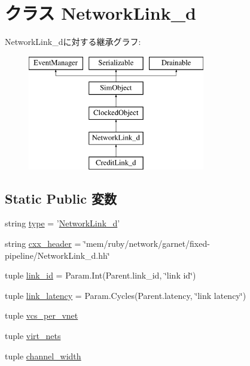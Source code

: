 \hypertarget{classGarnetLink__d_1_1NetworkLink__d}{
\section{クラス NetworkLink\_\-d}
\label{classGarnetLink__d_1_1NetworkLink__d}
}
NetworkLink\_\-dに対する継承グラフ:\begin{figure}[H]
\begin{center}
\leavevmode
\includegraphics[height=5cm]{classGarnetLink__d_1_1NetworkLink__d}
\end{center}
\end{figure}
\subsection*{Static Public 変数}
\begin{DoxyCompactItemize}
\item 
string \hyperlink{classGarnetLink__d_1_1NetworkLink__d_acce15679d830831b0bbe8ebc2a60b2ca}{type} = '\hyperlink{classGarnetLink__d_1_1NetworkLink__d}{NetworkLink\_\-d}'
\item 
string \hyperlink{classGarnetLink__d_1_1NetworkLink__d_a17da7064bc5c518791f0c891eff05fda}{cxx\_\-header} = \char`\"{}mem/ruby/network/garnet/fixed-\/pipeline/NetworkLink\_\-d.hh\char`\"{}
\item 
tuple \hyperlink{classGarnetLink__d_1_1NetworkLink__d_a68ad93ab49e865b9e80829c3ee7130c7}{link\_\-id} = Param.Int(Parent.link\_\-id, \char`\"{}link id\char`\"{})
\item 
tuple \hyperlink{classGarnetLink__d_1_1NetworkLink__d_aee092f519cc5d61dc0287dff3edd11ab}{link\_\-latency} = Param.Cycles(Parent.latency, \char`\"{}link latency\char`\"{})
\item 
tuple \hyperlink{classGarnetLink__d_1_1NetworkLink__d_a2bb2221cda9b94b6a0c2944d8a12f31e}{vcs\_\-per\_\-vnet}
\item 
tuple \hyperlink{classGarnetLink__d_1_1NetworkLink__d_a84c7a415611bc1b55aa5e7fd9e9601e8}{virt\_\-nets}
\item 
tuple \hyperlink{classGarnetLink__d_1_1NetworkLink__d_a1129edba1db6bd1f0c3d1ddda4be3d9d}{channel\_\-width}
\end{DoxyCompactItemize}


